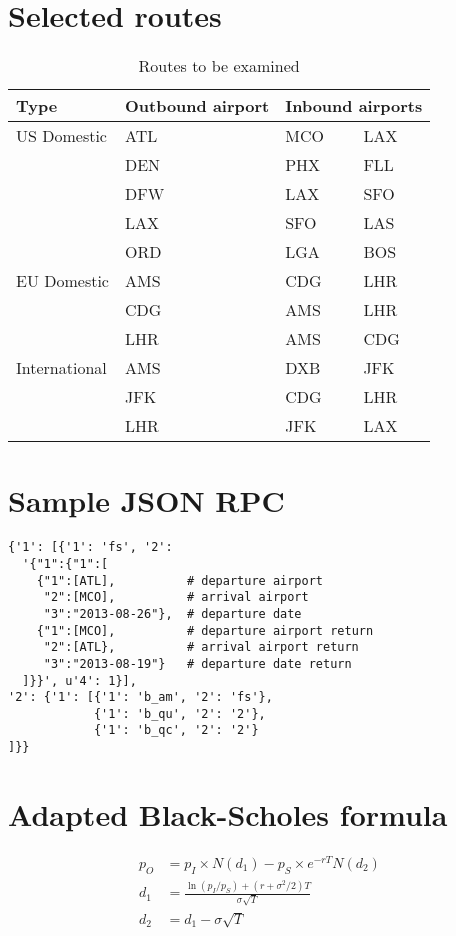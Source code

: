 \chapter{Selected routes}
\label{app:SelectedRoutes}
\begin{table}[h]
	\centering
    \begin{tabular}{ l | l | l l }
        Type        & Outbound airport & \multicolumn{2}{c}{Inbound airports}        \\ \hline \hline
        US Domestic & ATL & MCO & LAX \\
        ~           & DEN & PHX & FLL \\
        ~           & DFW & LAX & SFO \\
        ~           & LAX & SFO & LAS \\
        ~           & ORD & LGA & BOS \\
        EU Domestic & AMS & CDG & LHR \\
		~           & CDG & AMS & LHR \\
		~           & LHR & AMS & CDG \\
        International & AMS & DXB & JFK \\ 
        ~             & JFK & CDG & LHR \\
        ~             & LHR & JFK & LAX \\
    \end{tabular}
	\caption{Routes to be examined}
\end{table}

\chapter{Sample JSON RPC}
\label{app:SampleJSONRPC}
\small
\begin{verbatim}
{'1': [{'1': 'fs', '2':
  '{"1":{"1":[
    {"1":[ATL],          # departure airport
     "2":[MCO],          # arrival airport
     "3":"2013-08-26"},  # departure date
    {"1":[MCO],          # departure airport return
     "2":[ATL},          # arrival airport return
     "3":"2013-08-19"}   # departure date return
  ]}}', u'4': 1}],
'2': {'1': [{'1': 'b_am', '2': 'fs'},
            {'1': 'b_qu', '2': '2'},
            {'1': 'b_qc', '2': '2'}
]}}
\end{verbatim}

\chapter{Adapted Black-Scholes formula}
\label{app:AdaptedBlackScholesFormula}
\begin{align*}
p_O &= p_I \times N(d_1) - p_S \times e^{-rT}N(d_2) \\
d_1 &= \frac{\ln(p_I/p_S) + (r + \sigma^2/2)T}{\sigma \sqrt{T}} \\
d_2 &= d_1 - \sigma \sqrt{T}
\end{align*}

